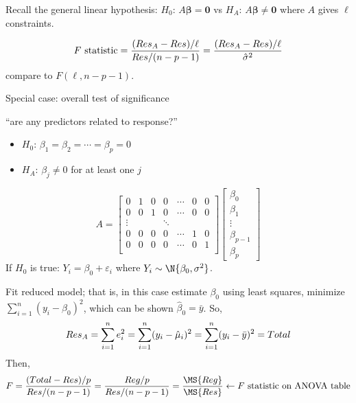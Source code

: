 Recall the general linear hypothesis:
$ H_0 $: $ A\symbf{\beta}=\symbf{0} $
vs $ H_A $: $ A\symbf{\beta}\neq \symbf{0} $
where $ A $ gives $ \ell $ constraints.

\[ F\text{ statistic}=
    \frac{(\relax{Res}_A-\relax{Res})/\ell}{\relax{Res}/(n-p-1)}=
    \frac{(\relax{Res}_A-\relax{Res})/\ell}{\hat{\sigma}^2}  \]
compare to $ F(\ell,n-p-1) $.

Special case: overall test of significance

``are any predictors related to response?''
\begin{itemize}
    \item $ H_0 $: $ \beta_1=\beta_2=\cdots=\beta_p=0 $
    \item $ H_A $: $ \beta_j\neq 0 $ for at least one $ j $
\end{itemize}
\[ A=\begin{bmatrix}
        0      & 1 & 0 & 0      & \cdots & 0 & 0 \\
        0      & 0 & 1 & 0      & \cdots & 0 & 0 \\
        \vdots &   &   & \ddots                  \\
        0      & 0 & 0 & 0      & \cdots & 1 & 0 \\
        0      & 0 & 0 & 0      & \cdots & 0 & 1 \\
    \end{bmatrix}\begin{bmatrix}
        \beta_0     \\
        \beta_1     \\
        \vdots      \\
        \beta_{p-1} \\
        \beta_p
    \end{bmatrix} \]
If $ H_0 $ is true: $ Y_i=\beta_0+\varepsilon_i $
where $ Y_i \sim \N{\beta_0,\sigma^2} $.

Fit reduced model; that is, in this case estimate $ \beta_0 $
using least squares, minimize $ \sum_{i=1}^{n} (y_i-\beta_0)^2 $,
which can be shown $ \hat{\beta}_0=\bar{y} $. So,
\[ \relax{Res}_A
    =\sum_{i=1}^{n} e_i^2
    =\sum_{i=1}^{n} (y_i-\hat{\mu}_i)^2
    =\sum_{i=1}^{n}(y_i-\bar{y})^2
    =\relax{Total} \]
Then,
\[ F=\frac{(\SS{Total}-\SS{Res})/p}{\SS{Res}/(n-p-1)}
    =\frac{\SS{Reg}/p}{\SS{Res}/(n-p-1)}
    =\frac{\MS{Reg}}{\MS{Res}}
    \leftarrow F\text{ statistic on ANOVA table}    \]
